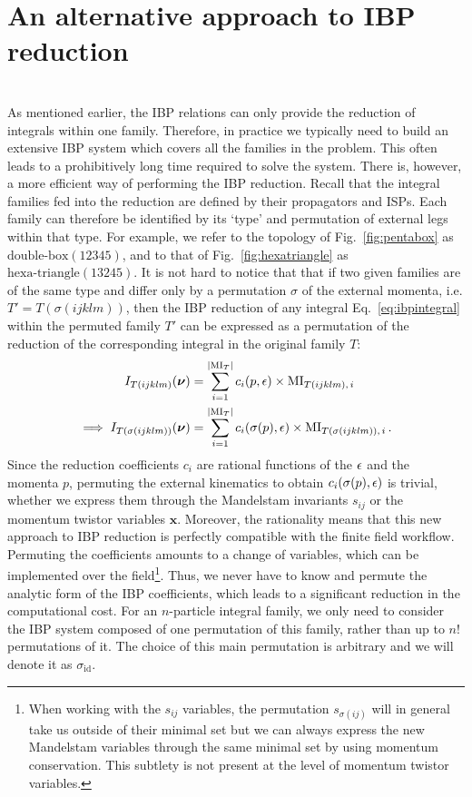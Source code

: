 \documentclass[main.tex]{subfiles}
\begin{document}
\section{An alternative approach to IBP reduction} \label{sec:altibps}
\\
As mentioned earlier, the IBP relations can only provide the reduction of integrals within one family. Therefore, in practice we typically need to build an extensive IBP system which covers all the families in the problem. This often leads to a prohibitively long time required to solve the system. There is, however, a more efficient way of performing the IBP reduction. Recall that the integral families fed into the reduction are defined by their propagators and ISPs. Each family can therefore be identified by its `type' and permutation of external legs within that type. For example, we refer to the topology of Fig.~\ref{fig:pentabox} as $\text{double-box}(12345)$, and to that of Fig.~\ref{fig:hexatriangle} as $\text{hexa-triangle}(13245)$. It is not hard to notice that that if two given families are of the same type and differ only by a permutation $\sigma$ of the external momenta, i.e. $T'=T(\sigma(ijklm))$, then the IBP reduction of any integral Eq.~\ref{eq:ibpintegral} within the permuted family $T'$ can be expressed as a permutation of the reduction of the corresponding integral in the original family $T$:
\begin{align}
    I_{T(ijklm)}(\bm{\nu}) &= \sum_{i=1}^{|\text{MI}_T|} c_i(p, \epsilon) \times \text{MI}_{T(ijklm),\,i} \\
    \implies I_{T(\sigma(ijklm))}(\bm{\nu}) &= \sum_{i=1}^{|\text{MI}_T|} c_i(\sigma(p), \epsilon) \times \text{MI}_{T(\sigma(ijklm)),\,i}\,.
\end{align}
  Since the reduction coefficients $c_i$ are rational functions of the $\epsilon$ and the momenta $p$, permuting the external kinematics to obtain $c_i(\sigma(p), \epsilon)$ is trivial, whether we express them through the Mandelstam invariants $s_{ij}$ or the momentum twistor variables $\bm{x}$. Moreover, the rationality means that this new approach to IBP reduction is perfectly compatible with the finite field workflow. Permuting the coefficients amounts to a change of variables, which can be implemented over the field\footnote{When working with the $s_{ij}$ variables, the permutation $s_{\sigma(ij)}$ will in general take us outside of their minimal set
but we can always express the new Mandelstam variables through the same minimal set by using momentum conservation. This subtlety is not present at the level of momentum twistor variables.}. Thus, we never have to know and permute the analytic form of the IBP coefficients, which leads to a significant reduction in the computational cost. For an $n$-particle integral family, we only need to consider the IBP system composed of one permutation of this family, rather than up to $n!$ permutations of it. The choice of this main permutation is arbitrary and we will denote it as $\sigma_\text{id}$.
\end{document}

